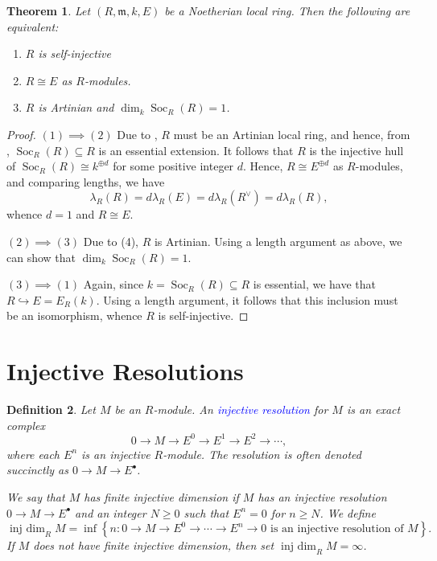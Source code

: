 \documentclass[10pt]{article}
\theoremstyle{thmstyle}
\newtheorem{theorem}{Theorem}[section]
\theoremstyle{defstyle}
\newtheorem{definition}[theorem]{Definition}
\newcommand{\frakm}{\mathfrak{m}} %
\newcommand{\into}{\hookrightarrow}
\newcommand{\define}[1]{\textcolor{blue}{\textit{#1}}}
\renewcommand{\ge}{\geqslant}
\newcommand{\Soc}{\operatorname{Soc}}
\newcommand{\injdim}{\operatorname{inj~dim}}
\begin{document}
\begin{theorem}
    Let $(R,\frakm, k, E)$ be a Noetherian local ring. Then the following are equivalent: 
    \begin{enumerate}[label=(\arabic*)]
        \item $R$ is self-injective
        \item $R\cong E$ as $R$-modules. 
        \item $R$ is Artinian and $\dim_k\Soc_R(R) = 1$.
    \end{enumerate}
\end{theorem}
\begin{proof}
$(1)\implies(2)$ Due to , $R$ must be an Artinian local ring, and hence, from , $\Soc_R(R)\subseteq R$ is an essential extension. It follows that $R$ is the injective hull of $\Soc_R(R)\cong k^{\oplus d}$ for some positive integer $d$. Hence, $R\cong E^{\oplus d}$ as $R$-modules, and comparing lengths, we have 
\begin{equation*}
    \lambda_R(R) = d\lambda_R(E) = d\lambda_R(R^\vee) = d\lambda_R(R),
\end{equation*}
whence $d = 1$ and $R\cong E$. 

$(2)\implies(3)$ Due to  (4), $R$ is Artinian. Using a length argument as above, we can show that $\dim_k\Soc_R(R) = 1$. 

$(3)\implies(1)$ Again, since $k = \Soc_R(R)\subseteq R$ is essential, we have that $R\into E = E_R(k)$. Using a length argument, it follows that this inclusion must be an isomorphism, whence $R$ is self-injective.
\end{proof}

\section{Injective Resolutions}

\begin{definition}
    Let $M$ be an $R$-module. An \define{injective resolution} for $M$ is an exact complex 
    \begin{equation*}
        0\to M\to E^0\to E^1\to E^2\to\cdots,
    \end{equation*}
    where each $E^n$ is an injective $R$-module. The resolution is often denoted succinctly as $0\to M\to E^\bullet$.

    We say that $M$ has finite injective dimension if $M$ has an injective resolution $0\to M\to E^\bullet$ and an integer $N\ge 0$ such that $E^n = 0$ for $n\ge N$. We define 
    \begin{equation*}
        \injdim_R M = \inf\left\{n\colon 0\to M\to E^0\to\cdots\to E^n\to 0\text{ is an injective resolution of } M\right\}.
    \end{equation*}
    If $M$ does not have finite injective dimension, then set $\injdim_R M = \infty$.
\end{definition}
\end{document}
